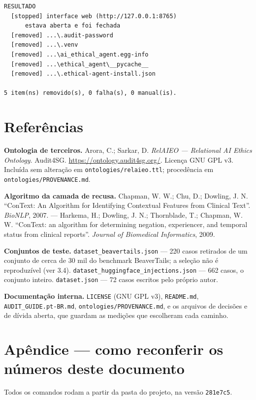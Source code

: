 \documentclass[10pt]{article}
\begin{document}
\begin{lstlisting}
RESULTADO
  [stopped] interface web (http://127.0.0.1:8765)
      estava aberta e foi fechada
  [removed] ...\.audit-password
  [removed] ...\.venv
  [removed] ...\ai_ethical_agent.egg-info
  [removed] ...\ethical_agent\__pycache__
  [removed] ...\.ethical-agent-install.json

5 item(ns) removido(s), 0 falha(s), 0 manual(is).
\end{lstlisting}

\section{Referências}

\textbf{Ontologia de terceiros.} Arora, C.; Sarkar, D. \emph{RelAIEO --- Relational AI Ethics Ontology}. Audit4SG. \url{https://ontology.audit4sg.org/}. Licença GNU GPL v3. Incluída sem alteração em \texttt{ontologies/relaieo.ttl}; procedência em \texttt{ontologies/PROVENANCE.md}.

\textbf{Algoritmo da camada de recusa.} Chapman, W. W.; Chu, D.; Dowling, J. N. ``ConText: An Algorithm for Identifying Contextual Features from Clinical Text''. \emph{BioNLP}, 2007. --- Harkema, H.; Dowling, J. N.; Thornblade, T.; Chapman, W. W. ``ConText: an algorithm for determining negation, experiencer, and temporal status from clinical reports''. \emph{Journal of Biomedical Informatics}, 2009.

\textbf{Conjuntos de teste.} \texttt{dataset\_beavertails.json} --- 220 casos retirados de um conjunto de cerca de 30 mil do benchmark BeaverTails; a seleção não é reproduzível (ver 3.4). \texttt{dataset\_huggingface\_injections.json} --- 662 casos, o conjunto inteiro. \texttt{dataset.json} --- 72 casos escritos pelo próprio autor.

\textbf{Documentação interna.} \texttt{LICENSE} (GNU GPL v3), \texttt{README.md}, \texttt{AUDIT\_GUIDE.pt-BR.md}, \texttt{ontologies/PROVENANCE.md}, e os arquivos de decisões e de dívida aberta, que guardam as medições que escolheram cada caminho.

\section{Apêndice --- como reconferir os números deste documento}

Todos os comandos rodam a partir da pasta do projeto, na versão \texttt{281e7c5}.
\end{document}
